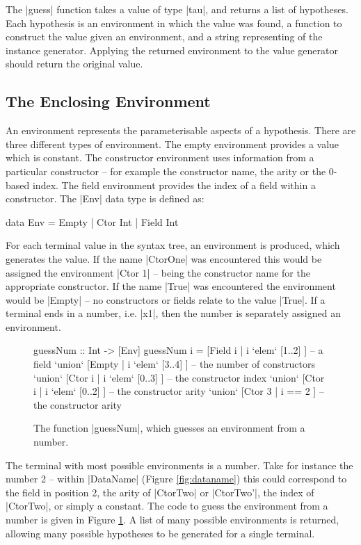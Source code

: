 \documentclass{llncs}
\begin{document}
The |guess| function takes a value of type |tau|, and returns a list of hypotheses. Each hypothesis is an environment in which the value was found, a function to construct the value given an environment, and a string representing of the instance generator. Applying the returned environment to the value generator should return the original value.


\subsection{The Enclosing Environment}
\label{sec:environment}

An environment represents the parameterisable aspects of a hypothesis. There are three different types of environment. The empty environment provides a value which is constant. The constructor environment uses information from a particular constructor -- for example the constructor name, the arity or the 0-based index. The field environment provides the index of a field within a constructor. The |Env| data type is defined as:

\begin{code}
data Env = Empty | Ctor Int | Field Int
\end{code}

For each terminal value in the syntax tree, an environment is produced, which generates the value. If the name |CtorOne| was encountered this would be assigned the environment |Ctor 1| -- being the constructor name for the appropriate constructor. If the name |True| was encountered the environment would be |Empty| -- no constructors or fields relate to the value |True|. If a terminal ends in a number, i.e. |x1|, then the number is separately assigned an environment. 

\begin{figure}[t]
\begin{code}
guessNum :: Int -> [Env]
guessNum i  =        [Field i  | i `elem` [1..2]  ]  -- a field
            `union`  [Empty    | i `elem` [3..4]  ]  -- the number of constructors
            `union`  [Ctor i   | i `elem` [0..3]  ]  -- the constructor index
            `union`  [Ctor i   | i `elem` [0..2]  ]  -- the constructor arity
            `union`  [Ctor 3   | i == 2           ]  -- the constructor arity
\end{code}
\caption{The function |guessNum|, which guesses an environment from a number.}
\label{fig:guessnum}
\end{figure}

The terminal with most possible environments is a number. Take for instance the number 2 -- within |DataName| (Figure \ref{fig:dataname}) this could correspond to the field in position 2, the arity of |CtorTwo| or |CtorTwo'|, the index of |CtorTwo|, or simply a constant. The code to guess the environment from a number is given in Figure \ref{fig:guessnum}. A list of many possible environments is returned, allowing many possible hypotheses to be generated for a single terminal.
\end{document}
